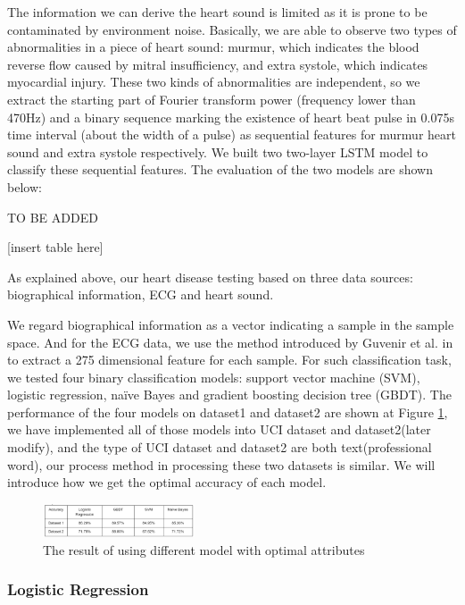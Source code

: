 \documentclass[letterpaper]{article} %
\begin{document}
The information we can derive the heart sound is limited as it is prone to be contaminated by environment noise. Basically, we are able to observe two types of abnormalities in a piece of heart sound: murmur, which indicates the blood reverse flow caused by mitral insufficiency, and extra systole, which indicates myocardial injury. These two kinds of abnormalities are independent, so we extract the starting part of Fourier transform power (frequency lower than 470Hz) and a binary sequence marking the existence of heart beat pulse in 0.075s time interval (about the width of a pulse) as sequential features for murmur heart sound and extra systole respectively. We built two two-layer LSTM model to classify these sequential features. The evaluation of the two models are shown below:

TO BE ADDED

[insert table here]

As explained above, our heart disease testing based on three data sources: biographical information, ECG and heart sound.

We regard biographical information as a vector indicating a sample in the sample space. And for the ECG data, we use the method introduced by Guvenir et al. in \cite{ECG} to extract a 275 dimensional feature for each sample.  For such classification task, we tested four binary classification models: support vector machine (SVM), logistic regression, naïve Bayes and gradient boosting decision tree (GBDT). 
The performance of the four models on dataset1 and dataset2 are shown at Figure \ref{fig:dataset-1-comparison}, we have implemented all of those models into UCI dataset and dataset2(later modify), and the type of UCI dataset and dataset2 are both text(professional word), our process method in processing these two datasets is similar. We will introduce how we get the optimal accuracy of each model.

\begin{figure}[!htbp]
\centering\includegraphics[width=0.4\textwidth]{dataset-1-comparison}
\caption{The result of using different model with optimal attributes}
\label{fig:dataset-1-comparison}
\end{figure}

\subsubsection{Logistic Regression} 
\end{document}

